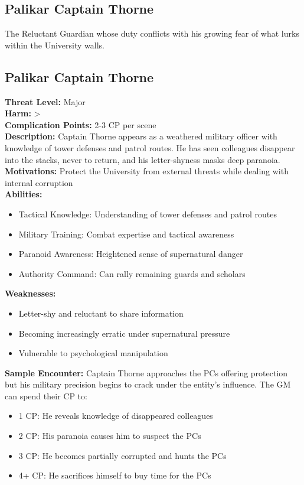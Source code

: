 \documentclass[11pt]{article}
\newenvironment{monsterentry}[1]{%
  \begin{mdframed}[backgroundcolor=shadecolor, linewidth=0pt, leftmargin=0pt, rightmargin=0pt]%
  \subsection*{#1}%
}{%
  \end{mdframed}%
}
\begin{document}
\subsection{Palikar Captain Thorne}

The Reluctant Guardian whose duty conflicts with his growing fear of what lurks within the University walls.

\begin{monsterentry}{Palikar Captain Thorne}
\textbf{Threat Level:} Major \\
\textbf{Harm:} \textgreater \\
\textbf{Complication Points:} 2-3 CP per scene \\
\textbf{Description:} Captain Thorne appears as a weathered military officer with knowledge of tower defenses and patrol routes. He has seen colleagues disappear into the stacks, never to return, and his letter-shyness masks deep paranoia. \\
\textbf{Motivations:} Protect the University from external threats while dealing with internal corruption \\
\textbf{Abilities:}
\begin{itemize}
    \item Tactical Knowledge: Understanding of tower defenses and patrol routes
    \item Military Training: Combat expertise and tactical awareness
    \item Paranoid Awareness: Heightened sense of supernatural danger
    \item Authority Command: Can rally remaining guards and scholars
\end{itemize}
\textbf{Weaknesses:}
\begin{itemize}
    \item Letter-shy and reluctant to share information
    \item Becoming increasingly erratic under supernatural pressure
    \item Vulnerable to psychological manipulation
\end{itemize}
\textbf{Sample Encounter:} Captain Thorne approaches the PCs offering protection but his military precision begins to crack under the entity's influence. The GM can spend their CP to:
\begin{itemize}
    \item 1 CP: He reveals knowledge of disappeared colleagues
    \item 2 CP: His paranoia causes him to suspect the PCs
    \item 3 CP: He becomes partially corrupted and hunts the PCs
    \item 4+ CP: He sacrifices himself to buy time for the PCs
\end{itemize}
\end{monsterentry}
\end{document}
